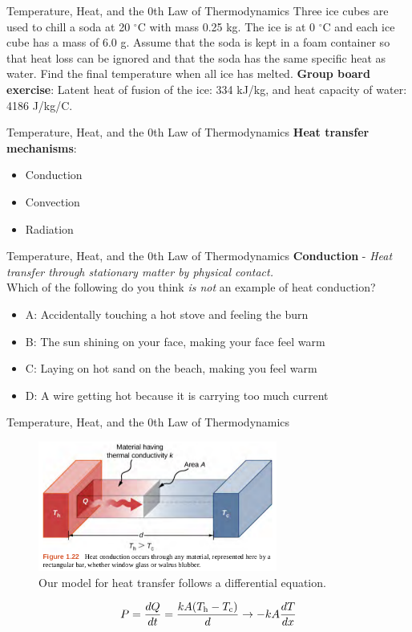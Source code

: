 \documentclass{beamer}
\begin{document}
\begin{frame}{Temperature, Heat, and the 0th Law of Thermodynamics}
Three ice cubes are used to chill a soda at 20 $^\circ$C with mass 0.25 kg. The ice is at 0 $^\circ$C and each ice cube has a mass of 6.0 g. Assume that the soda is kept in a foam container so that heat loss can be ignored and that the soda has the same specific heat as water. Find the final temperature when all ice has melted.
\textbf{Group board exercise}: Latent heat of fusion of the ice: 334 kJ/kg, and heat capacity of water: 4186 J/kg/C.
\end{frame}

\begin{frame}{Temperature, Heat, and the 0th Law of Thermodynamics}
\textbf{Heat transfer mechanisms}:
\begin{itemize}
\item Conduction
\item Convection
\item Radiation
\end{itemize}
\end{frame}

\begin{frame}{Temperature, Heat, and the 0th Law of Thermodynamics}
\textbf{Conduction} - \textit{Heat transfer through stationary matter by physical contact.} \\ \vspace{0.5cm}
Which of the following do you think \textit{is not} an example of heat conduction?
\begin{itemize}
\item A: Accidentally touching a hot stove and feeling the burn
\item B: The sun shining on your face, making your face feel warm
\item C: Laying on hot sand on the beach, making you feel warm
\item D: A wire getting hot because it is carrying too much current
\end{itemize}
\end{frame}

\begin{frame}{Temperature, Heat, and the 0th Law of Thermodynamics}
\begin{figure}
\centering
\includegraphics[width=0.7\textwidth]{figures/heat1.png}
\caption{\label{fig:heat1} Our model for heat transfer follows a differential equation.}
\end{figure}
\begin{equation}
P = \frac{dQ}{dt} = \frac{kA(T_{\rm h} - T_{\rm c})}{d} \rightarrow -kA \frac{dT}{dx}
\end{equation}
\end{frame}
\end{document}
